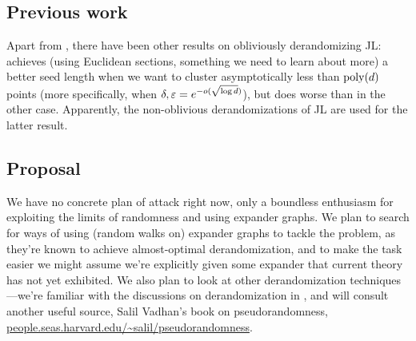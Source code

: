 
\subsection{Previous work}

Apart from \cite{kane2011almost}, there have been other results on
obliviously derandomizing JL: \cite{karnin2011explicit} achieves
(using Euclidean sections, something we need to learn about more) a
better seed length when we want to cluster asymptotically less than
$\operatorname{poly}(d)$ points (more specifically, when
$\delta,\varepsilon=e^{-o(\sqrt{\log d})}$), but does worse than
\cite{kane2011almost} in the other case. Apparently, the non-oblivious
derandomizations of JL
\cite{engebretsen2002derandomized,sivakumar2002algorithmic} are used
for the latter result.


\subsection{Proposal}

We have no concrete plan of attack right now, only a boundless
enthusiasm for exploiting the limits of randomness and using expander
graphs. We plan to search for ways of using (random walks on) expander
graphs to tackle the problem, as they're known to achieve
almost-optimal derandomization, and to make the task easier we might
assume we're explicitly given some expander that current theory has
not yet exhibited. We also plan to look at other derandomization
techniques---we're familiar with the discussions on derandomization in
\cite{motwani2010randomized}, and will consult another useful source,
Salil Vadhan's book on pseudorandomness,
\url{people.seas.harvard.edu/~salil/pseudorandomness}.



\nocite{*}





